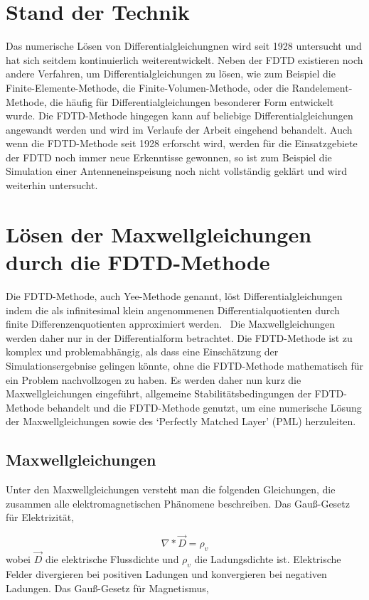 \documentclass[11pt, ngerman]{article}
\begin{document}
\section{Stand der Technik}
Das numerische L\"osen von Differentialgleichungnen wird seit 1928 untersucht
\cite{fdtd_u} und hat sich seitdem kontinuierlich weiterentwickelt.\cite{fdtd_history}
Neben der FDTD existieren noch andere Verfahren, um Differentialgleichungen
zu l\"osen, wie zum Beispiel die Finite-Elemente-Methode, die Finite-Volumen-Methode,
oder die Randelement-Methode, die h\"aufig f\"ur Differentialgleichungen
besonderer Form entwickelt wurde\cite{mathepedia_numerische_verfahren}.
Die FDTD-Methode hingegen kann auf beliebige Differentialgleichungen angewandt
werden und wird im Verlaufe der Arbeit eingehend behandelt.
Auch wenn die FDTD-Methode seit 1928 erforscht wird, werden f\"ur die Einsatzgebiete
der FDTD noch immer neue Erkenntisse gewonnen, so ist zum Beispiel die Simulation einer Antenneneinspeisung
noch nicht vollst\"andig gekl\"art und wird weiterhin untersucht\cite{advanced_gap_feed}.

\section{L\"osen der Maxwellgleichungen durch die FDTD-Methode}
Die FDTD-Methode, auch Yee-Methode genannt, l\"ost Differentialgleichungen
indem die als infinitesimal klein angenommenen Differentialquotienten
durch finite Differenzenquotienten approximiert werden.~\cite{fdtd_u}
Die Maxwellgleichungen werden daher nur in der Differentialform betrachtet.
Die FDTD-Methode ist zu komplex und problemabh\"angig,
als dass eine Einsch\"atzung der Simulationsergebnise gelingen k\"onnte, ohne die FDTD-Methode
mathematisch f\"ur ein Problem nachvollzogen zu haben.
Es werden daher nun kurz die Maxwellgleichungen eingef\"uhrt, allgemeine
Stabilit\"atsbedingungen der FDTD-Methode behandelt und die FDTD-Methode
genutzt, um eine numerische L\"osung der Maxwellgleichungen sowie des
`Perfectly Matched Layer' (PML) herzuleiten.

\subsection{Maxwellgleichungen}
Unter den Maxwellgleichungen versteht man die folgenden Gleichungen, die
zusammen alle elektromagnetischen Ph\"anomene beschreiben.
Das Gau{\ss}-Gesetz f\"ur Elektrizit\"at\cite{gausz_law_electric},

\begin{equation}
	\nabla * \vec{D} = \rho_v
	\label{eq:gausz_law_e}
\end{equation}
wobei \(\vec{D}\) die elektrische Flussdichte und \(\rho_v\) die Ladungsdichte ist.
Elektrische Felder divergieren bei positiven Ladungen und konvergieren bei negativen
Ladungen. Das Gau{\ss}-Gesetz f\"ur Magnetismus\cite{gausz_law_magnetic},
\end{document}
